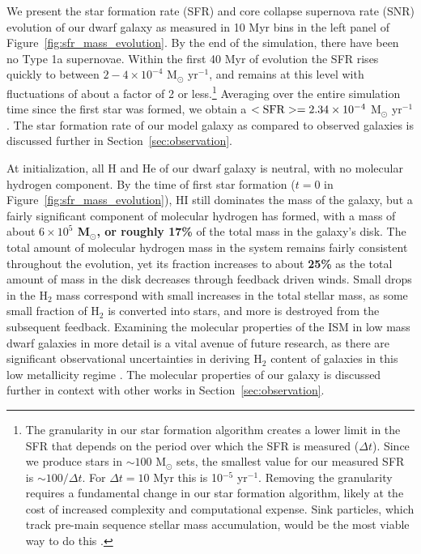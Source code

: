 \documentclass[twocolumn]{aastex61}
\begin{document}
We present the star formation rate (SFR) and core collapse supernova rate (SNR) evolution of our dwarf galaxy as measured in 10 Myr bins in the left panel of Figure~\ref{fig:sfr_mass_evolution}. By the end of the simulation, there have been no Type 1a supernovae. Within the first 40 Myr of evolution the SFR rises quickly to between $2-4 \times 10^{-4}$ M$_{\odot}$ yr$^{-1}$, and remains at this level with fluctuations of about a factor of 2 or less.\footnote{The granularity in our star formation algorithm creates a lower limit in the SFR that depends on the period over which the SFR is measured ($\Delta t$). Since we produce stars in $\sim 100$ M$_{\odot}$ sets, the smallest value for our measured SFR is $\sim 100/ \Delta t$. For $\Delta t = 10$ Myr this is 10$^{-5}$ yr$^{-1}$. Removing the granularity requires a fundamental change in our star formation algorithm, likely at the cost of increased complexity and computational expense. Sink particles, which track pre-main sequence stellar mass accumulation, would be the most viable way to do this \citep[see for example ][]{Krumholz2004,Federrath2010,GongOstriker2013,BleulerTeyssier2014,Sormani2017}.} Averaging over the entire simulation time since the first star was formed, we obtain a $<\rm{SFR}> = 2.34 \times 10^{-4}$ M$_{\odot}$ yr$^{-1}$. The star formation rate of our model galaxy as compared to observed galaxies is discussed further in Section~\ref{sec:observation}.

At initialization, all H and He of our dwarf galaxy is neutral, with no molecular hydrogen component. By the time of first star formation ($t=0$ in Figure~\ref{fig:sfr_mass_evolution}), HI still dominates the mass of the galaxy, but a fairly significant component of molecular hydrogen has formed, with a mass of about \textbf{$6 \times 10^5$ M$_{\odot}$, or roughly 17\%} of the total mass in the galaxy's disk. The total amount of molecular hydrogen mass in the system remains fairly consistent throughout the evolution, yet its fraction increases to about \textbf{25\%} as the total amount of mass in the disk decreases through feedback driven winds. Small drops in the H$_2$ mass correspond with small increases in the total stellar mass, as some small fraction of H$_2$ is converted into stars, and more is destroyed from the subsequent feedback. Examining the molecular properties of the ISM in low mass dwarf galaxies in more detail is a vital avenue of future research, as there are significant observational uncertainties in deriving H$_2$ content of galaxies in this low metallicity regime \citep{Leroy2008,McQuinn2012,Amorin2016}. The molecular properties of our galaxy is discussed further in context with other works in Section~\ref{sec:observation}.
\end{document}
